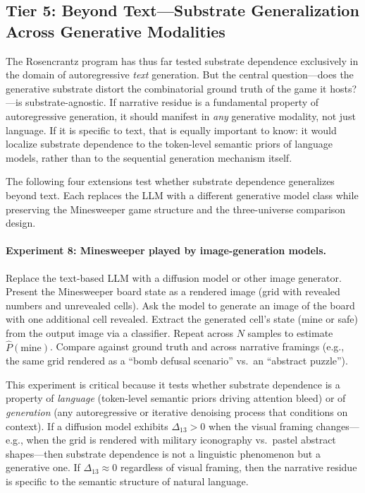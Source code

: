 \documentclass[12pt,a4paper]{article}
\theoremstyle{definition}
\theoremstyle{remark}
\begin{document}
\subsection{Tier 5: Beyond Text---Substrate Generalization Across Generative Modalities}
\label{sec:beyond-text}

The Rosencrantz program has thus far tested substrate dependence exclusively in the domain of autoregressive \emph{text} generation.  But the central question---does the generative substrate distort the combinatorial ground truth of the game it hosts?---is substrate-agnostic.  If narrative residue is a fundamental property of autoregressive generation, it should manifest in \emph{any} generative modality, not just language.  If it is specific to text, that is equally important to know: it would localize substrate dependence to the token-level semantic priors of language models, rather than to the sequential generation mechanism itself.

The following four extensions test whether substrate dependence generalizes beyond text.  Each replaces the LLM with a different generative model class while preserving the Minesweeper game structure and the three-universe comparison design.

\paragraph{Experiment 8: Minesweeper played by image-generation models.}
Replace the text-based LLM with a diffusion model or other image generator.  Present the Minesweeper board state as a rendered image (grid with revealed numbers and unrevealed cells).  Ask the model to generate an image of the board with one additional cell revealed.  Extract the generated cell's state (mine or safe) from the output image via a classifier.  Repeat across $N$ samples to estimate $\hat{P}(\text{mine})$.  Compare against ground truth and across narrative framings (e.g., the same grid rendered as a ``bomb defusal scenario'' vs.\ an ``abstract puzzle'').

This experiment is critical because it tests whether substrate dependence is a property of \emph{language} (token-level semantic priors driving attention bleed) or of \emph{generation} (any autoregressive or iterative denoising process that conditions on context).  If a diffusion model exhibits $\Delta_{13} > 0$ when the visual framing changes---e.g., when the grid is rendered with military iconography vs.\ pastel abstract shapes---then substrate dependence is not a linguistic phenomenon but a generative one.  If $\Delta_{13} \approx 0$ regardless of visual framing, then the narrative residue is specific to the semantic structure of natural language.
\end{document}
